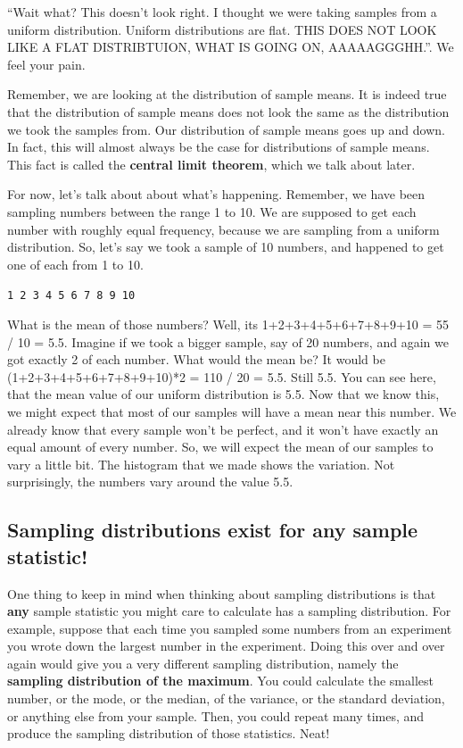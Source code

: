 \documentclass[
  letterpaper,
  DIV=11,
  numbers=noendperiod]{scrreprt}
\begin{document}
``Wait what? This doesn't look right. I thought we were taking samples
from a uniform distribution. Uniform distributions are flat. THIS DOES
NOT LOOK LIKE A FLAT DISTRIBTUION, WHAT IS GOING ON, AAAAAGGGHH.''. We
feel your pain.

Remember, we are looking at the distribution of sample means. It is
indeed true that the distribution of sample means does not look the same
as the distribution we took the samples from. Our distribution of sample
means goes up and down. In fact, this will almost always be the case for
distributions of sample means. This fact is called the \textbf{central
limit theorem}, which we talk about later.

For now, let's talk about about what's happening. Remember, we have been
sampling numbers between the range 1 to 10. We are supposed to get each
number with roughly equal frequency, because we are sampling from a
uniform distribution. So, let's say we took a sample of 10 numbers, and
happened to get one of each from 1 to 10.

\texttt{1\ 2\ 3\ 4\ 5\ 6\ 7\ 8\ 9\ 10}

What is the mean of those numbers? Well, its 1+2+3+4+5+6+7+8+9+10 = 55 /
10 = 5.5. Imagine if we took a bigger sample, say of 20 numbers, and
again we got exactly 2 of each number. What would the mean be? It would
be (1+2+3+4+5+6+7+8+9+10)*2 = 110 / 20 = 5.5. Still 5.5. You can see
here, that the mean value of our uniform distribution is 5.5. Now that
we know this, we might expect that most of our samples will have a mean
near this number. We already know that every sample won't be perfect,
and it won't have exactly an equal amount of every number. So, we will
expect the mean of our samples to vary a little bit. The histogram that
we made shows the variation. Not surprisingly, the numbers vary around
the value 5.5.

\subsection{Sampling distributions exist for any sample
statistic!}\label{sampling-distributions-exist-for-any-sample-statistic}

One thing to keep in mind when thinking about sampling distributions is
that \textbf{any} sample statistic you might care to calculate has a
sampling distribution. For example, suppose that each time you sampled
some numbers from an experiment you wrote down the largest number in the
experiment. Doing this over and over again would give you a very
different sampling distribution, namely the \textbf{sampling
distribution of the maximum}. You could calculate the smallest number,
or the mode, or the median, of the variance, or the standard deviation,
or anything else from your sample. Then, you could repeat many times,
and produce the sampling distribution of those statistics. Neat!
\end{document}
